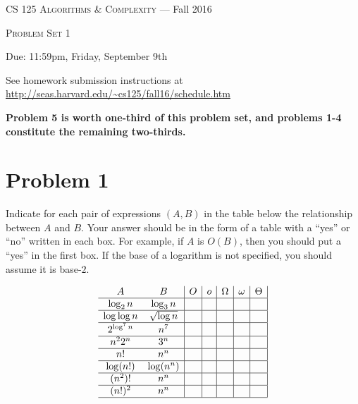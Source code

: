 \documentclass[12pt]{article}
\begin{document}
\thispagestyle{empty}

\begin{center}
{\Large \textsc{CS 125 Algorithms \& Complexity} --- Fall 2016}

\bigskip

{\Large \textsc{Problem Set 1}}

\smallskip

Due: 11:59pm, Friday, September 9th

\bigskip

{\footnotesize See homework submission instructions at \url{http://seas.harvard.edu/~cs125/fall16/schedule.htm}}
\end{center}

\textbf{Problem 5 is worth one-third of this problem set, and problems 1-4 constitute the remaining two-thirds.}

\section*{Problem 1}
Indicate for each pair of expressions $(A,B)$ in the table below
the relationship between $A$ and $B$.  Your answer should be in the
form of a table with a ``yes'' or ``no'' written in each box.  For
example, if $A$ is $O(B)$, then you should put a ``yes'' in the 
first box. If the base of a logarithm is not specified, you should assume it is base-$2$.

\bigskip

$$
\begin{array}{cc|c|c|c|c|c|}
A & B & O & o & \Omega & \omega & \Theta \\ \hline
\log_2 n & \log_3 n & & & & & \\ \hline
\log \log n & \sqrt{\log n} & & & & & \\ \hline
2^{\log^7 n} & n^7 & & & & & \\ \hline
n^2 2^n & 3^n & & & & & \\ \hline
n! & n^n & & & & & \\ \hline
\log (n!) & \log(n^n) & & & & & \\ \hline
(n^2)! & n^n & & & & & \\ \hline
(n!)^2 & n^n & & & & & \\ \hline
\end{array}
$$
\end{document}
